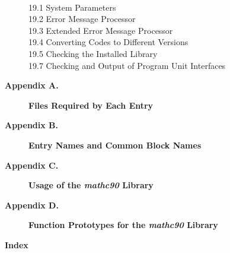 \documentclass[twoside]{MATH77}
\begin{document}
\begin{description}
\vspace{-20pt}
\begin{tabbing}
\hspace{.45in}\=\\
19.1 \> System Parameters\\
19.2 \> Error Message Processor\\
19.3 \> Extended Error Message Processor\\
19.4 \> Converting Codes to Different Versions\\
19.5 \> Checking the Installed Library\\
19.7 \> Checking and Output of Program Unit Interfaces\\
\end{tabbing}\vspace{-15pt}

%

\item[\large \bf Appendix A.]  {\large {\bf Files Required by Each Entry}}

\item[\large \bf Appendix B.]  {\large {\bf Entry Names and Common Block
Names}}\rule{0pt}{15pt}

\item[\large \bf Appendix C.]  {\large {\bf Usage of the {\em mathc90}
Library}}\rule{0pt}{15pt}

\item[\large \bf Appendix D.]  {\large {\bf Function Prototypes for the
{\em mathc90} Library}}\rule{0pt}{15pt}

\item[\large \bf Index]\rule{0pt}{15pt}
\end{description}
\end{document}

